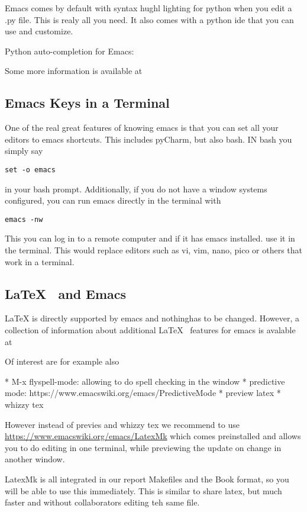Emacs comes by default with syntax hughl lighting for python when you
edit a .py file. This is realy all you need. It also comes with a
python ide that you can use and customize.

Python auto-completion for Emacs:



Some more information is available at


\subsection{Emacs Keys in a Terminal}

One of the real great features of knowing emacs is that you can set
all your editors to emacs shortcuts. This includes pyCharm, but also
bash. IN bash you simply say 

\begin{verbatim}
set -o emacs
\end{verbatim}

in your bash prompt. Additionally, if you do not have a window systems
configured, you can run emacs directly in the terminal with 

\begin{verbatim}
emacs -nw
\end{verbatim}

This you can log in to a remote computer and if it has emacs
installed. use it in the terminal. This would replace editors such as
vi, vim, nano, pico or others that work in a terminal.

\subsection{\LaTeX~  and Emacs}

LaTeX is directly supported by emacs and nothinghas to be
changed. However, a collection of information about additional \LaTeX~
features for emacs is avalable at


Of interest are for example also 

* M-x flyspell-mode: allowing to do spell checking in the window
* predictive mode: https://www.emacswiki.org/emacs/PredictiveMode
* preview latex
* whizzy tex

However instead of previes and whizzy tex we recommend to use
\url{https://www.emacswiki.org/emacs/LatexMk} which comes preinstalled
and allows you to do editing in one terminal, while previewing the
update on change in another window.

LatexMk is all integrated in our report Makefiles and the Book format,
so you will be able to use this immediately. This is similar to share
latex, but much faster and without collaborators editing teh same file.